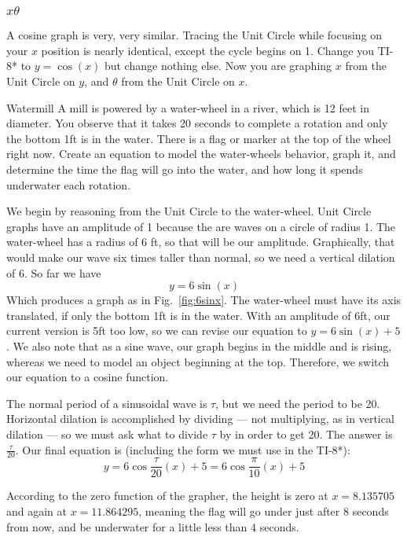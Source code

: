 \subsubsection{$x\theta$}
A cosine graph is very, very similar.  Tracing the Unit Circle while focusing on your
$x$ position is nearly identical, except the cycle begins on 1.  Change you TI-8* to
$y=\cos(x)$ but change nothing else.  Now you are graphing $x$ from the Unit Circle
on $y$, and $\theta$ from the Unit Circle on $x$.

\begin{example}{Watermill}
\exProblem
A mill is powered by a water-wheel in a river, which is 12 feet in diameter.  You observe
that it takes 20 seconds to complete a rotation and only the bottom 1ft is in the water.
There is a flag or marker at the top of the wheel right now.
Create an equation to model the water-wheels behavior, graph it, and determine the
time the flag will go into the water, and how long it spends underwater each rotation.


\exSolution

We begin by reasoning from the Unit Circle to the water-wheel.  Unit Circle graphs have an
amplitude of 1 because the are waves on a circle of radius 1.  The water-wheel has
a radius of 6 ft, so that will be our amplitude.  Graphically, that would make our wave
six times taller than normal, so we need a vertical dilation of 6.  So far we have
$$
y=6\sin(x)
$$
Which produces a graph as in Fig.~\ref{fig:6sinx}.  The water-wheel must have its axis
translated, if only the bottom 1ft is in the water.  With an amplitude of 6ft, our current
version is 5ft too low, so we can revise our equation to $y=6\sin(x)+5$.  We also note
that as a sine wave, our graph begins in the middle and is rising, whereas we need to
model an object beginning at the top.  Therefore, we switch our equation to a cosine 
function.

The normal period of a sinusoidal wave is $\tau$, but we need the period to be 20.
Horizontal dilation is accomplished by dividing --- not multiplying, as in vertical
dilation --- so we must ask what to divide $\tau$ by in order to get 20.  The answer is
$\frac{\tau}{20}$.  Our final equation is (including the form we must use in the TI-8*):
$$
y=6\cos\frac{\tau}{20}(x)+5 = 6\cos\frac{\pi}{10}(x)+5
$$

According to the zero function of the grapher, the height is zero at $x=8.135705$
and again at $x=11.864295$, meaning the flag will go under just after 8 seconds
from now, and be underwater for a little less than 4 seconds.

\end{example}


